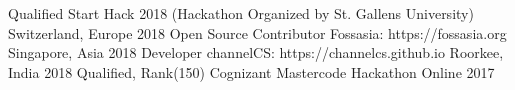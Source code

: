\begin{cvhonors}
  \cvhonor
    {Qualified}
    {Start Hack 2018 (Hackathon Organized by St. Gallens University)}
    {Switzerland, Europe}
    {2018}
 \cvhonor
    {Open Source Contributor}
    {Fossasia: https://fossasia.org}
    {Singapore, Asia}
    {2018}
 \cvhonor
    {Developer}
    {channelCS: https://channelcs.github.io}
    {Roorkee, India}
    {2018}
  \cvhonor
    {Qualified, Rank(150)} 
    {Cognizant Mastercode Hackathon}
    {Online}
    {2017}

\end{cvhonors}

